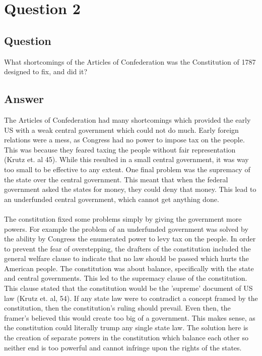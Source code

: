 \documentclass[12pt]{article}
\begin{document}
\section*{Question 2}
\subsection*{Question}
What shortcomings of the Articles of Confederation was the Constitution of 1787 designed
to fix, and did it?
\subsection*{Answer}
The Articles of Confederation had many shortcomings which provided the early US with a
weak central government which could not do much. Early foreign relations were a mess, as
Congress had no power to impose tax on the people. This was because they feared taxing the
people without fair representation (Krutz et. al 45). While this resulted in a small
central government, it was way too small to be effective to any extent. One final problem
was the supremacy of the state over the central government. This meant that when the
federal government asked the states for money, they could deny that money. This lead to an
underfunded central government, which cannot get anything done. 
\paragraph{}
\indent The constitution fixed some problems simply by giving the government more
powers. For example the problem of an underfunded government was solved by the ability by
Congress the enumerated power to levy tax on the people. In order to prevent the fear of
overstepping, the drafters of the constitution included the general welfare clause to
indicate that no law should be passed which hurts the American people. The constitution
was about balance, specifically with the state and central governments. This led to the
supremacy clause of the constitution. This clause stated that the constitution would be
the 'supreme' document of US law (Krutz et. al, 54). If any state law were to contradict a
concept framed by the constitution, then the constitution's ruling should prevail. Even
then, the framer's believed this would create too big of a government. This makes sense, as
the constitution could literally trump any single state law. The solution here is the
creation of separate powers in the constitution which balance each other so neither end is
too powerful and cannot infringe upon the rights of the states.
\newpage
\end{document}
